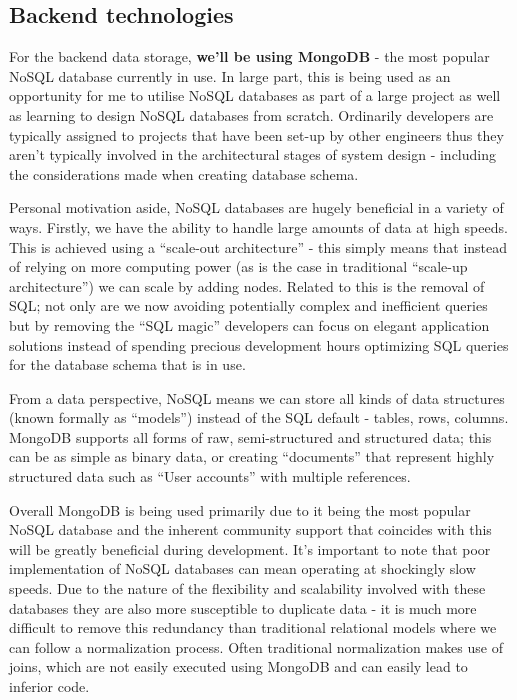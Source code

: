 \subsection{Backend technologies}
For the backend data storage, \textbf{we'll be using MongoDB}
- the most popular NoSQL database currently in use.
In large part, this is being used as an opportunity for me
to utilise NoSQL databases as part of a large project as well as
learning to design NoSQL databases from scratch. Ordinarily
developers are typically assigned to projects that have been set-up
by other engineers thus they aren't typically involved in the
architectural stages of system design - including the considerations made when creating database schema.
\par
Personal motivation aside, NoSQL databases are hugely beneficial in a variety of ways.
Firstly, we have the ability to handle large amounts of data at high speeds.
This is achieved using a ``scale-out architecture'' - this simply means that instead
of relying on more computing power (as is the case in traditional ``scale-up architecture'')
we can scale by adding nodes. Related to this is the removal of SQL; not only
are we now avoiding potentially complex and inefficient queries but by
removing the ``SQL magic'' developers can focus on elegant application solutions instead
of spending precious development hours optimizing SQL queries for the database schema that
is in use.
\par
From a data perspective, NoSQL means we can store all kinds of data
structures (known formally as ``models'') instead of the SQL default - tables, rows, columns.
MongoDB supports all forms of raw, semi-structured and structured data; this can be as simple
as binary data, or creating ``documents'' that represent highly structured data such as ``User accounts''
with multiple references.
\par
Overall MongoDB is being used primarily due to it being the most popular NoSQL database and the inherent
community support that coincides with this will be greatly beneficial during development.
It's important to note that poor implementation of NoSQL databases
can mean operating at shockingly slow speeds. Due to the nature of the flexibility and scalability
involved with these databases they are also more susceptible to duplicate data - it is much more difficult
to remove this redundancy than traditional relational models where we can follow a normalization process.
Often traditional normalization makes use of joins, which are not easily executed using MongoDB
and can easily lead to inferior code.
\pagebreak

